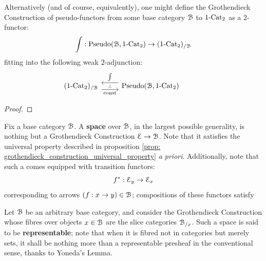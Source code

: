                 \begin{proposition} \label{prop: grothendieck_construction_universal_property}
                    Alternatively (and of course, equivalently), one might define the Grothendieck Construction of pseudo-functors from some base category $\mathcal{B}$ to $1\text{-}\mathrm{Cat}_2$ as a $2$-functor:
                        $$\int: \mathrm{Pseudo}(\mathcal{B}, 1\text{-}\mathrm{Cat}_2) \to (1\text{-}\mathrm{Cat}_2)_{/\mathcal{B}}$$
                    fitting into the following weak $2$-adjunction:
                        $$
                            \begin{tikzcd}
                            	{(1\-\Cat_2)_{/\calB}} & {\Pseudo(\calB, 1\-\Cat_2)} & {}
                            	\arrow[""{name=0, anchor=center, inner sep=0}, "\const"', shift right=2, from=1-1, to=1-2]
                            	\arrow[""{name=1, anchor=center, inner sep=0}, "\int"', shift right=2, from=1-2, to=1-1]
                            	\arrow["\dashv"{anchor=center, rotate=-90}, draw=none, from=1, to=0]
                            \end{tikzcd}
                        $$
                \end{proposition}
                    \begin{proof}
                        
                    \end{proof}
                \begin{corollary} \label{coro: grothendieck_constructions_are_oplax_colimits}
                    
                \end{corollary}
                
                \begin{definition}[Spaces] \label{def: spaces} 
                    Fix a base category $\mathcal{B}$. A \textbf{space} over $\mathcal{B}$, in the largest possible generality, is nothing but a Grothendieck Construction $\mathcal{E} \to \mathcal{B}$. Note that it satisfies the universal property described in proposition \ref{prop: grothendieck_construction_universal_property} \textit{a priori}. Additionally, note that such a  comes equipped with transition functors:
                        $$f^*: \mathcal{E}_y \to \mathcal{E}_x$$
                    corresponding to arrows $(f: x \to y) \in \mathcal{B}$; compositions of these functors satisfy 
                \end{definition}
                \begin{example} \label{exmaple: representable_spaces}
                    Let $\mathcal{B}$ be an arbitrary base category, and consider the Grothendieck Construction whose fibres over objects $x \in \mathcal{B}$ are the slice categories $\mathcal{B}_{/x}$. Such a space is said to be \textbf{representable}; note that when it is fibred not in categories but merely sets, it shall be nothing more than a representable presheaf in the conventional sense, thanks to Yoneda's Lemma.
                \end{example}
                
